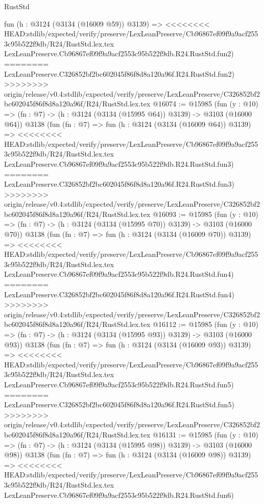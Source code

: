 \begin{lexlean}{RustStd}
\begin{coremodule}
{\begin{coremodule}
{{{{{{{{{{{{{{{{{{{{{{{{{{    fun (h : @3124 (@3134 (@16009 @59)) @3139) =>
<<<<<<<< HEAD:stdlib/expected/verify/preserve/LexLeanPreserve/Cb96867ef09f9a9acf2553c95b522f9db/R24/RustStd.lex.tex
    LexLeanPreserve.Cb96867ef09f9a9acf2553c95b522f9db.R24.RustStd.fun2)
========
    LexLeanPreserve.C326852bf2bc602045f86f8d8a120a96f.R24.RustStd.fun2)
>>>>>>>> origin/release/v0.4:stdlib/expected/verify/preserve/LexLeanPreserve/C326852bf2bc602045f86f8d8a120a96f/R24/RustStd.lex.tex
@16074 := @15985
    (fun (y : @10) => (fn : @7) -> (h : @3124 (@3134 (@15995 @64)) @3139) -> @3103 (@16000 @64))
    @3138
    (fun (fn : @7) =>
    fun (h : @3124 (@3134 (@16009 @64)) @3139) =>
<<<<<<<< HEAD:stdlib/expected/verify/preserve/LexLeanPreserve/Cb96867ef09f9a9acf2553c95b522f9db/R24/RustStd.lex.tex
    LexLeanPreserve.Cb96867ef09f9a9acf2553c95b522f9db.R24.RustStd.fun3)
========
    LexLeanPreserve.C326852bf2bc602045f86f8d8a120a96f.R24.RustStd.fun3)
>>>>>>>> origin/release/v0.4:stdlib/expected/verify/preserve/LexLeanPreserve/C326852bf2bc602045f86f8d8a120a96f/R24/RustStd.lex.tex
@16093 := @15985
    (fun (y : @10) => (fn : @7) -> (h : @3124 (@3134 (@15995 @70)) @3139) -> @3103 (@16000 @70))
    @3138
    (fun (fn : @7) =>
    fun (h : @3124 (@3134 (@16009 @70)) @3139) =>
<<<<<<<< HEAD:stdlib/expected/verify/preserve/LexLeanPreserve/Cb96867ef09f9a9acf2553c95b522f9db/R24/RustStd.lex.tex
    LexLeanPreserve.Cb96867ef09f9a9acf2553c95b522f9db.R24.RustStd.fun4)
========
    LexLeanPreserve.C326852bf2bc602045f86f8d8a120a96f.R24.RustStd.fun4)
>>>>>>>> origin/release/v0.4:stdlib/expected/verify/preserve/LexLeanPreserve/C326852bf2bc602045f86f8d8a120a96f/R24/RustStd.lex.tex
@16112 := @15985
    (fun (y : @10) => (fn : @7) -> (h : @3124 (@3134 (@15995 @93)) @3139) -> @3103 (@16000 @93))
    @3138
    (fun (fn : @7) =>
    fun (h : @3124 (@3134 (@16009 @93)) @3139) =>
<<<<<<<< HEAD:stdlib/expected/verify/preserve/LexLeanPreserve/Cb96867ef09f9a9acf2553c95b522f9db/R24/RustStd.lex.tex
    LexLeanPreserve.Cb96867ef09f9a9acf2553c95b522f9db.R24.RustStd.fun5)
========
    LexLeanPreserve.C326852bf2bc602045f86f8d8a120a96f.R24.RustStd.fun5)
>>>>>>>> origin/release/v0.4:stdlib/expected/verify/preserve/LexLeanPreserve/C326852bf2bc602045f86f8d8a120a96f/R24/RustStd.lex.tex
@16131 := @15985
    (fun (y : @10) => (fn : @7) -> (h : @3124 (@3134 (@15995 @98)) @3139) -> @3103 (@16000 @98))
    @3138
    (fun (fn : @7) =>
    fun (h : @3124 (@3134 (@16009 @98)) @3139) =>
<<<<<<<< HEAD:stdlib/expected/verify/preserve/LexLeanPreserve/Cb96867ef09f9a9acf2553c95b522f9db/R24/RustStd.lex.tex
    LexLeanPreserve.Cb96867ef09f9a9acf2553c95b522f9db.R24.RustStd.fun6)
}}}}}}}}}}}}}}}}}}}}}}}}}}
\end{coremodule}}
\end{coremodule}
\end{lexlean}
